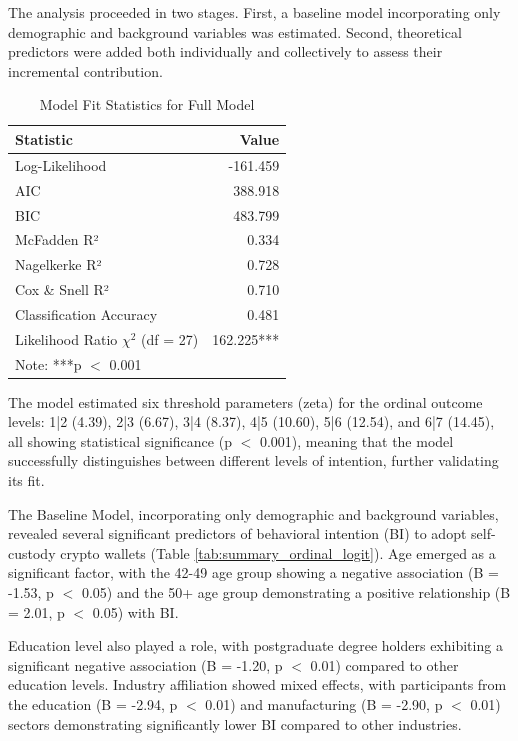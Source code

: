 \documentclass[twocolumn]{article}
\begin{document}
The analysis proceeded in two stages. First, a baseline model incorporating only demographic and background variables was estimated. Second, theoretical predictors were added both individually and collectively to assess their incremental contribution.

\begin{table}[htbp]
\centering
\caption{Model Fit Statistics for Full Model}
\label{tab:modelfit}
\begin{tabular}{lr}
\hline
Statistic & Value \\
\hline
Log-Likelihood & -161.459 \\
AIC & 388.918 \\
BIC & 483.799 \\
McFadden R² & 0.334 \\
Nagelkerke R² & 0.728 \\
Cox \& Snell R² & 0.710 \\
Classification Accuracy & 0.481 \\
Likelihood Ratio $\chi^2$ (df = 27) & 162.225*** \\
\hline
\multicolumn{2}{l}{\small Note: ***p $<$ 0.001} \\
\end{tabular}
\end{table}

The model estimated six threshold parameters (zeta) for the ordinal outcome levels: 1|2 (4.39), 2|3 (6.67), 3|4 (8.37), 4|5 (10.60), 5|6 (12.54), and 6|7 (14.45), all showing statistical significance (p $<$ 0.001), meaning that the model successfully distinguishes between different levels of intention, further validating its fit.

The Baseline Model, incorporating only demographic and background variables, revealed several significant predictors of behavioral intention (BI) to adopt self-custody crypto wallets (Table \ref{tab:summary_ordinal_logit}). Age emerged as a significant factor, with the 42-49 age group showing a negative association (B = -1.53, p $<$ 0.05) and the 50+ age group demonstrating a positive relationship (B = 2.01, p $<$ 0.05) with BI. 

Education level also played a role, with postgraduate degree holders exhibiting a significant negative association (B = -1.20, p $<$ 0.01) compared to other education levels. Industry affiliation showed mixed effects, with participants from the education (B = -2.94, p $<$ 0.01) and manufacturing (B = -2.90, p $<$ 0.01) sectors demonstrating significantly lower BI compared to other industries.
\end{document}
